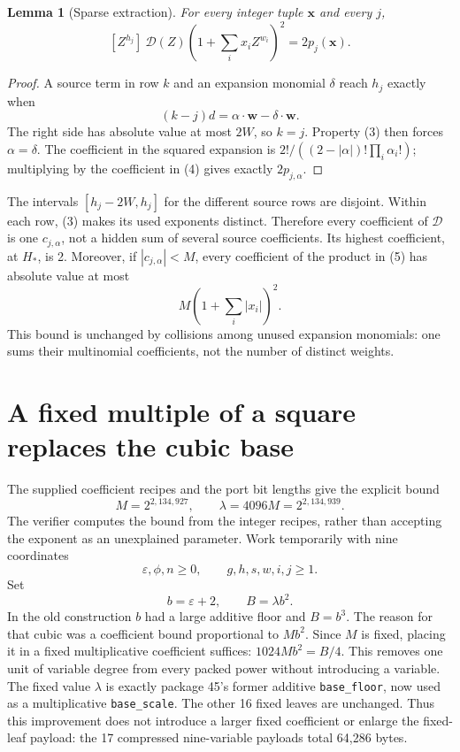 \documentclass[11pt]{article}
\newtheorem{lemma}[theorem]{Lemma}
\theoremstyle{definition}\newtheorem{definition}[theorem]{Definition}
\begin{document}
\begin{lemma}[Sparse extraction]
For every integer tuple $\boldsymbol{x}$ and every $j$,
\[
 [Z^{h_j}]\ \mathcal D(Z)
       \left(1+\sum_i x_iZ^{w_i}\right)^2=2p_j(\boldsymbol{x}).
 \tag{5}\label{eq:extract}
\]
\end{lemma}
\begin{proof}
A source term in row $k$ and an expansion monomial $\delta$ reach
$h_j$ exactly when
\[
 (k-j)d=\alpha\cdot\boldsymbol w-\delta\cdot\boldsymbol w.
\]
The right side has absolute value at most $2W$, so $k=j$.
Property (3) then forces $\alpha=\delta$. The coefficient in the
squared expansion is
$2!/((2-|\alpha|)!\prod_i\alpha_i!)$; multiplying by the coefficient
in (4) gives exactly $2p_{j,\alpha}$.
\end{proof}

The intervals $[h_j-2W,h_j]$ for the different source rows are disjoint.
Within each row, (3) makes its used exponents distinct. Therefore every
coefficient of $\mathcal D$ is one $c_{j,\alpha}$, not a hidden sum of
several source coefficients. Its highest coefficient, at $H_*$, is 2.
Moreover, if $|c_{j,\alpha}|<M$, every coefficient of the product in
(5) has absolute value at most
\[
 M\left(1+\sum_i|x_i|\right)^2.                 \tag{6}\label{eq:coefbound}
\]
This bound is unchanged by collisions among unused expansion monomials:
one sums their multinomial coefficients, not the number of distinct
weights.

\section{A fixed multiple of a square replaces the cubic base}
\label{sec:base}

The supplied coefficient recipes and the port bit lengths give the
explicit bound
\[
 M=2^{2,134,927},\qquad \lambda=4096M=2^{2,134,939}.
 \tag{7}\label{eq:lambda}
\]
The verifier computes the bound from the integer recipes, rather than
accepting the exponent as an unexplained parameter. Work temporarily
with nine coordinates
\[
 \varepsilon,\phi,n\geq0,\qquad g,h,s,w,i,j\geq1.
 \tag{8}\label{eq:mixed}
\]
Set
\[
 b=\varepsilon+2,\qquad B=\lambda b^2.
 \tag{9}\label{eq:base}
\]
In the old construction $b$ had a large additive floor and $B=b^3$.
The reason for that cubic was a coefficient bound proportional to
$Mb^2$. Since $M$ is fixed, placing it in a fixed multiplicative
coefficient suffices: $1024Mb^2=B/4$. This removes one unit of
variable degree from every packed power without introducing a variable.
The fixed value $\lambda$ is exactly package 45's former additive
\texttt{base\_floor}, now used as a multiplicative \texttt{base\_scale}.
The other 16 fixed leaves are unchanged. Thus this improvement does not
introduce a larger fixed coefficient or enlarge the fixed-leaf payload:
the 17 compressed nine-variable payloads total 64,286 bytes.
\end{document}
